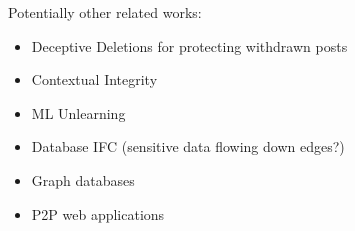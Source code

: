 Potentially other related works:
\begin{itemize}
    \item Deceptive Deletions for protecting withdrawn posts %
    \item Contextual Integrity
    \item ML Unlearning
    \item Database IFC (sensitive data flowing down edges?)
    \item Graph databases
    \item P2P web applications
\end{itemize}
